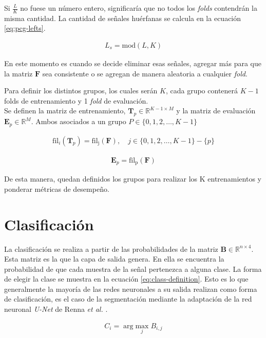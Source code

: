 \indent Si $\frac{L}{K}$ no fuese un número entero, significaría que no todos los \textit{folds} contendrán la misma
cantidad. La cantidad de señales huérfanas se calcula en la ecuación \ref{eq:pcg-lefts}.

\begin{align} \label{eq:pcg-lefts}
  L_{s} = \mathrm{mod}(L,K)
\end{align}

\indent En este momento es cuando se decide eliminar esas señales, agregar más para que la matriz $\mathbf{F}$ sea
consistente o se agregan de manera aleatoria a cualquier \textit{fold}.

Para definir los distintos grupos, los cuales serán $K$, cada grupo contenerá $K-1$ folds de entrenamiento y 1
\textit{fold} de evaluación. \\
\indent Se definen la matriz de entrenamiento, $\bm{T}_p \in \mathbb{R}^{K-1 \times M}$ y la matriz de evaluación
$\mathbf{E}_p \in \mathbb{R}^M$. Ambos asociados a un grupo $P \in \{0,1,2,\dots,K-1\}$

\begin{align}
  \mathrm{fil}_i(\bm{T}_p) = \mathrm{fil_j(\bm{F})}, \quad j \in \{0,1,2,\dots,K-1\}-\{p\}
\end{align}

\begin{align}
  \bm{E}_{p} = \mathrm{fil_p}(\bm{F})
\end{align}

\indent De esta manera, quedan definidos los grupos para realizar los K entrenamientos y ponderar métricas de
desempeño.

\section{Clasificación}

\indent La clasificación se realiza a partir de las probabilidades de la matriz $\bm{B} \in \mathbb{R}^{n \times 4}$.
Esta matriz es la que la capa de salida genera. En ella se encuentra la probabilidad de que cada muestra de la
señal pertenezca a alguna clase. La forma de elegir la clase se muestra en la ecuación \ref{eq:class-definition}.
Esto es lo que generalmente la mayoría de las redes neuronales a su salida realizan como forma de clasificación, es
el caso de la segmentación mediante la adaptación de la red neuronal \textit{U-Net} de Renna \textit{et al.}
\cite{pp:renna2018}.

\begin{align} \label{eq:class-definition}
C_i = \arg \underset{j}{\mathrm{max}} \; B_{i,j}
\end{align}

